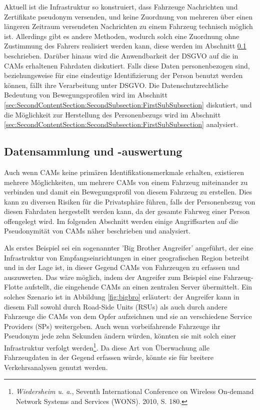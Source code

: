Aktuell ist die Infrastruktur so konstruiert, dass Fahrzeuge Nachrichten und Zertifikate pseudonym versenden, und keine Zuordnung von mehreren über einen längeren Zeitraum versendeten Nachrichten zu einem Fahrzeug technisch möglich ist. Allerdings gibt es andere Methoden, wodurch solch eine Zuordnung ohne Zustimmung des Fahrers realisiert werden kann, diese werden im Abschnitt \ref{sec:FirstContentSection:ThirdSubSection} beschrieben. Darüber hinaus wird die Anwendbarkeit der DSGVO auf die in CAMs erhaltenen Fahrdaten diskutiert. Falls diese Daten personenbezogen sind, beziehungsweise für eine eindeutige Identifizierung der Person benutzt werden können, fällt ihre Verarbeitung unter DSGVO. Die Datenschutzrechtliche Bedeutung von Bewegungsprofilen wird im Abschnitt \ref{sec:SecondContentSection:SecondSubsection:FirstSubSubsection} diskutiert, und die Möglichkeit zur Herstellung des Personenbezugs wird im Abschnitt \ref{sec:SecondContentSection:SecondSubsection:FirstSubSubsection} analysiert.

\subsection{Datensammlung und -auswertung}
\label{sec:FirstContentSection:ThirdSubSection}

Auch wenn CAMs keine primären Identifikationsmerkmale erhalten, existieren mehrere Möglichkeiten, um mehrere CAMs von einem Fahrzeug miteinander zu verbinden und damit ein Bewegungsprofil von diesem Fahrzeug zu erstellen. Dies kann zu diversen Risiken für die Privatsphäre führen, falls der Personenbezug von diesen Fahrdaten hergestellt werden kann, da der gesamte Fahrweg einer Person offengelegt wird. Im folgenden Abschnitt werden einige Angriffsarten auf die Pseudonymität von CAMs näher beschrieben und analysiert. 

Als erstes Beispiel sei ein sogenannter 'Big Brother Angreifer' angeführt, der eine Infrastruktur von Empfangseinrichtungen in einer geografischen Region betreibt und in der Lage ist, in dieser Gegend CAMs von Fahrzeugen zu erfassen und auszuwerten. Das wäre möglich, indem der Angreifer zum Beispiel eine Fahrzeug-Flotte aufstellt, die eingehende CAMs an einen zentralen Server übermittelt. Ein solches Szenario ist in Abbildung \ref{fig:bigbro} erläutert: der Angreifer kann in diesem Fall sowohl durch Road-Side Units (RSUs) als auch durch andere Fahrzeuge die CAMs von dem Opfer aufzeichnen und sie an verschiedene Service Providers (SPs) weitergeben. Auch wenn vorbeifahrende Fahrzeuge ihr Pseudonym jede zehn Sekunden ändern würden, könnten sie mit solch einer Infrastruktur verfolgt werden\footnote{\emph{Wiedersheim u. a.}, Seventh International Conference on Wireless On-demand Network Systems and Services (WONS). 2010, S. 180.}\nocite{Wiedersheim2010}. Da diese Art von Überwachung alle Fahrzeugdaten in der Gegend erfassen würde, könnte sie für breitere Verkehrsanalysen genutzt werden.

